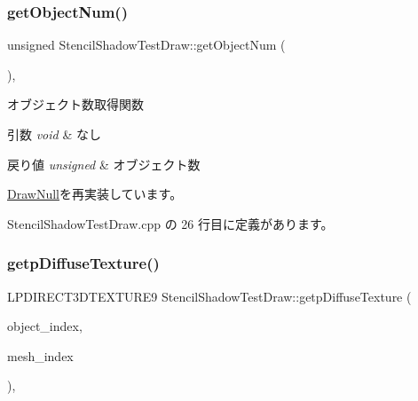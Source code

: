 \subsubsection{\texorpdfstring{get\+Object\+Num()}{getObjectNum()}}
{\footnotesize\ttfamily unsigned Stencil\+Shadow\+Test\+Draw\+::get\+Object\+Num (\begin{DoxyParamCaption}{ }\end{DoxyParamCaption})\hspace{0.3cm}{\ttfamily [override]}, {\ttfamily [virtual]}}



オブジェクト数取得関数 


\begin{DoxyParams}{引数}
{\em void} & なし \\
\hline
\end{DoxyParams}

\begin{DoxyRetVals}{戻り値}
{\em unsigned} & オブジェクト数 \\
\hline
\end{DoxyRetVals}


\mbox{\hyperlink{class_draw_null_a8bddfa6ee87e47b2ecbbe6803b088e37}{Draw\+Null}}を再実装しています。



 Stencil\+Shadow\+Test\+Draw.\+cpp の 26 行目に定義があります。

\mbox{\label{class_stencil_shadow_test_draw_a5c74550a8e0eccf29f3c93e5027e492e}} 
\subsubsection{\texorpdfstring{getp\+Diffuse\+Texture()}{getpDiffuseTexture()}}
{\footnotesize\ttfamily L\+P\+D\+I\+R\+E\+C\+T3\+D\+T\+E\+X\+T\+U\+R\+E9 Stencil\+Shadow\+Test\+Draw\+::getp\+Diffuse\+Texture (\begin{DoxyParamCaption}\item[{unsigned}]{object\+\_\+index,  }\item[{unsigned}]{mesh\+\_\+index }\end{DoxyParamCaption})\hspace{0.3cm}{\ttfamily [override]}, {\ttfamily [virtual]}}




